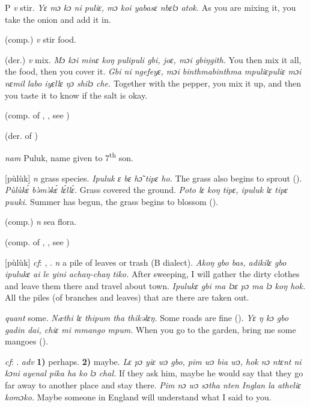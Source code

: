 \begin{letter}{P}
 \textit{v} stir. \textit{Yɛ mɔ kɔ ni puliɛ, mɔ koi yabasɛ nbɛlɔ atok.} As you are mixing it, you take the onion and add it in.

 (comp.) \textit{v} stir food.

 (der.) \textit{v} mix. \textit{Mɔ kɔi minɛ koŋ pulipuli gbi, joɛ, mɔi gbiŋgith.} You then mix it all, the food, then you cover it. \textit{Gbi ni ngefeyɛ, mɔi binthmabinthma mpuliɛpuliɛ mɔi nɛmil labo iyɛllɛ ŋɔ shilɔ che.} Together with the pepper, you mix it up, and then you taste it to know if the salt is okay.

 (comp. of , , see ) 

 (der. of ) 

 \textit{nam} Puluk, name given to 7\textsuperscript{th} son. 

 [pùlùk] \textit{n} grass species. \textit{Ipuluk ɛ bɛ hɔ̃ tipɛ ho.} The grass also begins to sprout (\citealt{Pichl1967}). \textit{Pùlùkɛ́ bə̀mə̀kɛ́ lɛ́llɛ̀.} Grass covered the ground. \textit{Poto lɛ koŋ tipɛ, ipuluk lɛ tipɛ puuki.} Summer has begun, the grass begins to blossom (\citealt{Pichl1967}). 

 (comp.) \textit{n} sea flora. 

 (comp. of , , see ) 

 [pùlùk] \textit{cf}: , . \textit{n} a pile of leaves or trash (B dialect). \textit{Akoŋ gbo bas, adikilɛ gbo ipulukɛ ai le yini achaŋ-chaŋ tiko.} After sweeping, I will gather the dirty clothes and leave them there and travel about town. \textit{Ipulukɛ gbi ma lɔɛ pɔ ma lɔ koŋ hok.} All the piles (of branches and leaves) that are there are taken out.

 \textit{quant} some. \textit{Næthi lɛ thipum tha thikəlɛŋ.} Some roads are fine (\citealt{Pichl1967}). \textit{Yɛ ŋ kɔ gbo gadin dai, chiɛ mi mmango mpum.}	When you go to the garden, bring me some mangoes (\citealt{Pichl1967}).

 \textit{cf}: . \textit{adv} \textbf{1)} perhaps. \textbf{2)} maybe. \textit{Lɛ pɔ yiɛ wɔ gbo, pim wɔ bia wɔ, hok nɔ ntɛnt ni kɔni ayenal pika ha ko lɔ chal.} If they ask him, maybe he would say that they go far away to another place and stay there. \textit{Pim nɔ wɔ sɔtha nten Inglan la atheliɛ komɔko.} Maybe someone in England will understand what I said to you.


\end{letter}
